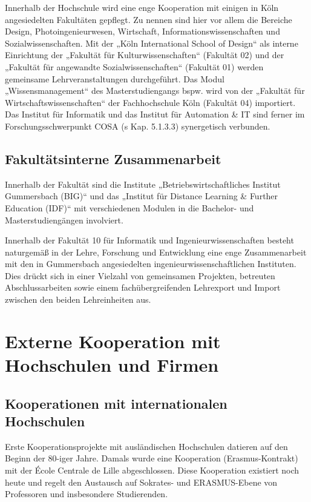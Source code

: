 Innerhalb der Hochschule wird eine enge Kooperation mit einigen in Köln
angesiedelten Fakultäten gepflegt. Zu nennen sind hier vor allem die
Bereiche Design, Photoingenieurwesen, Wirtschaft,
Informationswissenschaften und Sozialwissenschaften. Mit der „Köln
International School of Design`` als interne Einrichtung der „Fakultät
für Kulturwissenschaften`` (Fakultät 02) und der „Fakultät für
angewandte Sozialwissenschaften`` (Fakultät 01) werden gemeinsame
Lehrveranstaltungen durchgeführt. Das Modul „Wissensmanagement`` des
Masterstudiengangs bspw. wird von der „Fakultät für
Wirtschaftswissenschaften`` der Fachhochschule Köln (Fakultät 04)
importiert. Das Institut für Informatik und das Institut für Automation
\& IT sind ferner im Forschungsschwerpunkt COSA (s Kap. 5.1.3.3)
synergetisch verbunden.

\subsection{Fakultätsinterne
Zusammenarbeit}\label{fakultuxe4tsinterne-zusammenarbeit}

Innerhalb der Fakultät sind die Institute „Betriebswirtschaftliches
Institut Gummersbach (BIG)`` und das „Institut für Distance Learning \&
Further Education (IDF)`` mit verschiedenen Modulen in die Bachelor- und
Masterstudiengängen involviert.

Innerhalb der Fakultät 10 für Informatik und Ingenieurwissenschaften
besteht naturgemäß in der Lehre, Forschung und Entwicklung eine enge
Zusammenarbeit mit den in Gummersbach angesiedelten
ingenieurwissenschaftlichen Instituten. Dies drückt sich in einer
Vielzahl von gemeinsamen Projekten, betreuten Abschlussarbeiten sowie
einem fachübergreifenden Lehrexport und Import zwischen den beiden
Lehreinheiten aus.

\section{Externe Kooperation mit Hochschulen und
Firmen}\label{externe-kooperation-mit-hochschulen-und-firmen}

\subsection{Kooperationen mit internationalen
Hochschulen}\label{kooperationen-mit-internationalen-hochschulen}

Erste Kooperationsprojekte mit ausländischen Hochschulen datieren auf
den Beginn der 80-iger Jahre. Damals wurde eine Kooperation
(Erasmus-Kontrakt) mit der École Centrale de Lille abgeschlossen. Diese
Kooperation existiert noch heute und regelt den Austausch auf Sokrates-
und ERASMUS-Ebene von Professoren und insbesondere Studierenden.

